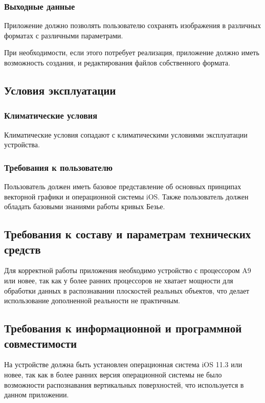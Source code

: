 \documentclass{../TechDoc}
\begin{document}
    \subsubsection{Выходные данные}
    
    Приложение должно позволять пользователю сохранять изображения в различных форматах с различными параметрами.
    
    При необходимости, если этого потребует реализация, приложение должно иметь возможность создания, и редактирования файлов собственного формата.
    
    \subsection{Условия эксплуатации}
    
    \subsubsection{Климатические условия}
    
    Климатические условия сопадают с климатическими условиями эксплуатации устройства.

    \subsubsection{Требования к пользователю}
    
    Пользователь должен иметь базовое представление об основных принципах векторной графики и операционной системы iOS. Также пользователь должен обладать базовыми знаниями работы кривых Безье.

    \subsection{Требования к составу и параметрам технических средств}
    
    Для корректной работы приложения необходимо устройство с процессором A9 или новее, так как у более ранних процессоров не хватает мощности для обработки данных в распознавании плоскостей реальных объектов, что делает использование дополненной реальности не практичным.
    

    \subsection{Требования к информационной и программной совместимости}
    
    На устройстве должна быть установлен операционная система iOS 11.3 или новее, так как в более ранних версия операционной системы не было возможности распознавания вертикальных поверхностей, что используется в данном приложении.
    
\end{document}
